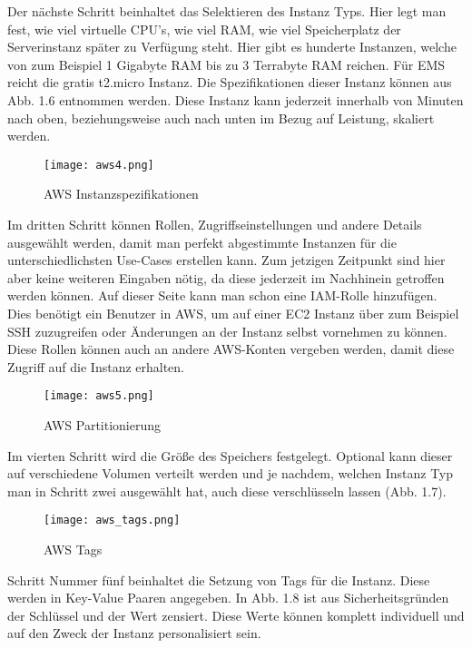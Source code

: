 Der nächste Schritt beinhaltet das Selektieren des Instanz Typs.
Hier legt man fest, wie viel virtuelle CPU's, wie viel RAM, wie viel Speicherplatz der Serverinstanz später zu Verfügung steht.
Hier gibt es hunderte Instanzen, welche von zum Beispiel 1 Gigabyte RAM bis zu 3 Terrabyte RAM reichen.
Für EMS reicht die gratis t2.micro Instanz. Die Spezifikationen dieser Instanz können aus Abb. 1.6 entnommen werden.
Diese Instanz kann jederzeit innerhalb von Minuten nach oben, beziehungsweise auch nach unten im Bezug auf Leistung, skaliert werden.
\begin{center}
\begin{figure}[H]
    \centering
    \texttt{[image: aws4.png]}
    \caption{AWS Instanzspezifikationen}
\end{figure}
\end{center}
Im dritten Schritt können Rollen, Zugriffseinstellungen und andere Details ausgewählt werden, damit man perfekt abgestimmte Instanzen für die unterschiedlichsten Use-Cases erstellen kann. Zum jetzigen Zeitpunkt sind hier aber keine weiteren Eingaben nötig, da diese jederzeit im Nachhinein getroffen werden können. Auf dieser Seite kann man schon eine IAM-Rolle hinzufügen. Dies benötigt ein Benutzer in AWS, um auf einer EC2 Instanz über zum Beispiel SSH zuzugreifen oder Änderungen an der Instanz selbst vornehmen zu können. Diese Rollen können auch an andere AWS-Konten vergeben werden, damit diese Zugriff auf die Instanz erhalten.
\begin{center}
\begin{figure}[H]
    \centering
    \texttt{[image: aws5.png]}
    \caption{AWS Partitionierung}
\end{figure}
\end{center}
Im vierten Schritt wird die Größe des Speichers festgelegt. Optional kann dieser auf verschiedene Volumen verteilt werden und je nachdem, welchen Instanz Typ man in Schritt zwei ausgewählt hat, auch diese verschlüsseln lassen (Abb. 1.7).
\begin{center}
\begin{figure}[H]
    \centering
    \texttt{[image: aws\_tags.png]}
    \caption{AWS Tags}
\end{figure}
\end{center}
Schritt Nummer fünf beinhaltet die Setzung von Tags für die Instanz.
Diese werden in Key-Value Paaren angegeben. In Abb. 1.8 ist aus Sicherheitsgründen der Schlüssel und der Wert zensiert. Diese Werte können komplett individuell und auf den Zweck der Instanz personalisiert sein.
